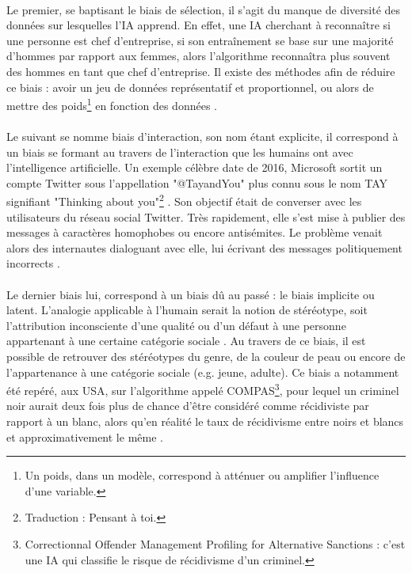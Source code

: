 \documentclass[10pt, french, a4paper]{report}
\begin{document}
\paragraph{}
Le premier, se baptisant le biais de sélection, il s’agit du manque de diversité des données sur lesquelles l'IA apprend. En effet, une IA cherchant à reconnaître si une personne est chef d’entreprise, si son entraînement se base sur une majorité d’hommes par rapport aux femmes, alors l’algorithme reconnaîtra plus souvent des hommes en tant que chef d’entreprise. Il existe des méthodes afin de réduire ce biais : avoir un jeu de données représentatif et proportionnel, ou alors de mettre des poids\footnote{Un poids, dans un modèle, correspond à atténuer ou amplifier l'influence d'une variable.} en fonction des données \citep{tran_selection_2017}.

\paragraph{}
Le suivant se nomme biais d’interaction, son nom étant explicite, il correspond à un biais se formant au travers de l’interaction que les humains ont avec l’intelligence artificielle. Un exemple célèbre date de 2016, Microsoft sortit un compte Twitter sous l’appellation "@TayandYou" plus connu sous le nom TAY signifiant "Thinking about you"\footnote{Traduction : Pensant à toi.} . Son objectif était de converser avec les utilisateurs du réseau social Twitter. Très rapidement, elle s’est mise à publier des messages à caractères homophobes ou encore antisémites. Le problème venait alors des internautes dialoguant avec elle, lui écrivant des messages politiquement incorrects \citep{tual_peine_2016}.

\paragraph{}
Le dernier biais lui, correspond à un biais dû au passé : le biais implicite ou latent. L’analogie applicable à l’humain serait la notion de stéréotype, soit l’attribution inconsciente d’une qualité ou d’un défaut à une personne appartenant à une certaine catégorie sociale \citep{greenwald_implicit_1995}. Au travers de ce biais, il est possible de retrouver des stéréotypes du genre, de la couleur de peau ou encore de l’appartenance à une catégorie sociale (e.g. jeune, adulte). Ce biais a notamment été repéré, aux USA, sur l’algorithme appelé COMPAS\footnote{Correctionnal Offender Management Profiling for Alternative Sanctions : c’est une IA qui classifie le risque de récidivisme d’un criminel.}, pour lequel un criminel noir aurait deux fois plus de chance d’être considéré comme récidiviste par rapport à un blanc, alors qu’en réalité le taux de récidivisme entre noirs et blancs et approximativement le même \citep{larson_how_2016}.
\end{document}
